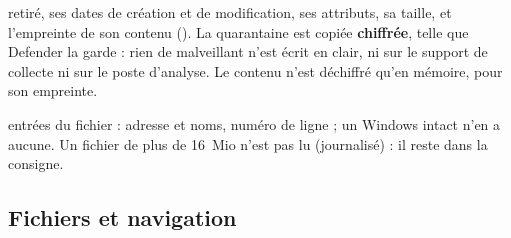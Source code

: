 \documentclass[11pt,a4paper,oneside]{report}
\begin{document}
\begin{description}[style=nextline,leftmargin=1.2em]
        retiré, ses dates de création et de modification, ses attributs, sa
        taille, et l'empreinte de son contenu (). La
        quarantaine est copiée \textbf{chiffrée}, telle que Defender la garde :
        rien de malveillant n'est écrit en clair, ni sur le support de collecte
        ni sur le poste d'analyse. Le contenu n'est déchiffré qu'en mémoire,
        pour son empreinte.
  \item[\fichier{hosts.json}] entrées du fichier  : adresse et
        noms, numéro de ligne ; un Windows intact n'en a aucune. Un fichier de plus
        de 16~Mio n'est pas lu (journalisé) : il reste dans la consigne.
\end{description}

\subsection{Fichiers et navigation}
\end{document}
